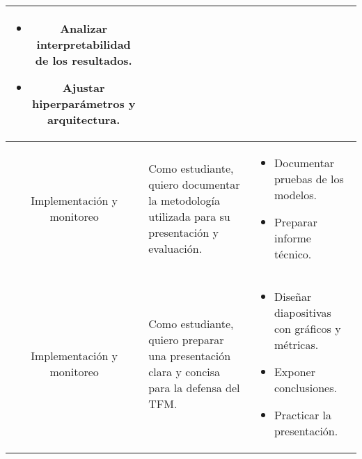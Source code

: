 \begin{table}[h]
{\begin{tabular}{|c|p{8cm}|p{8cm}|}
        \begin{itemize}
            \item Analizar interpretabilidad de los resultados.
            \item Ajustar hiperparámetros y arquitectura.
        \end{itemize} \\
        \hline
        Implementación y monitoreo & Como estudiante, quiero documentar la metodología utilizada para su presentación y evaluación. & 
        \begin{itemize}
            \item Documentar pruebas de los modelos.
            \item Preparar informe técnico.
        \end{itemize} \\
        \hline
        Implementación y monitoreo & Como estudiante, quiero preparar una presentación clara y concisa para la defensa del TFM. & 
        \begin{itemize}
            \item Diseñar diapositivas con gráficos y métricas.
            \item Exponer conclusiones.
            \item Practicar la presentación.
        \end{itemize} \\
        \hline
    \end{tabular}}
\end{table}
